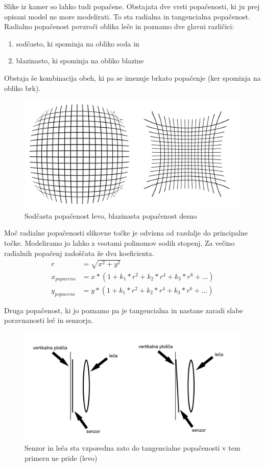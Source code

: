 \documentclass[a4paper, 12pt]{book}
\begin{document}
Slike iz kamer so lahko tudi popačene. Obstajata dve vrsti popačenosti, ki ju prej opisani model ne more modelirati. To sta radialna in tangencialna popačenost. Radialno popačenost povzroči oblika leče in poznamo dve glavni različici:
\begin{enumerate}
\item sodčasto, ki spominja na obliko soda in
\item blazinasto, ki spominja na obliko blazine
\end{enumerate}
Obstaja še kombinacija obeh, ki pa se imenuje brkato popačenje (ker spominja na obliko brk).

\begin{figure}[H]
\centering
\includegraphics[width=\textwidth,height=\textheight,keepaspectratio]{distorsion.png}
\caption{Sodčasta popačenost levo, blazinasta popačenost desno}
\end{figure}

Moč radialne popačenosti slikovne točke je odvisna od razdalje do principalne točke. Modeliramo jo lahko z vsotami polinomov sodih stopenj. Za večino radialnih popačenj zadoščata že dva koeficienta. 
\begin{align}
r &= \sqrt{x^2 + y^2} \\
x_{popaceno} &= x * (1 + k_1*r^2 + k_2*r^4 + k_3*r^6 + \dots) \\
y_{popaceno} &= y * (1 + k_1*r^2 + k_2*r^4 + k_3*r^6 + \dots)
\end{align}

Druga popačenost, ki jo poznamo pa je tangencialna in nastane zaradi slabe poravnanosti leč in senzorja.

\begin{figure}[H]
\centering
\includegraphics[width=\textwidth,height=\textheight,keepaspectratio]{tangential.png}
\caption{Senzor in leča sta vzporedna zato do tangencialne popačenosti v tem primeru ne pride (levo)}
\end{figure}
\end{document}
